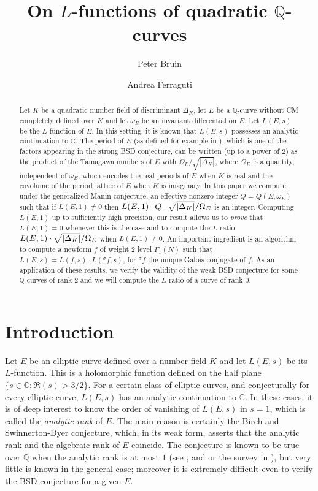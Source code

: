 \documentclass[11pt]{amsart}
\author[P.\thinspace J. Bruin]{Peter Bruin}
\author[A. Ferraguti]{Andrea Ferraguti}
\date{}
\title{On $L$-functions of quadratic ${\mathbb{Q}}$-curves}
\theoremstyle{definition}
\begin{document}
\begin{abstract}
Let $K$ be a quadratic number field of discriminant $\Delta_K$, let $E$ be a ${\mathbb{Q}}$-curve without CM completely defined over $K$ and let $\omega_E$ be an invariant differential on $E$. Let $L(E,s)$ be the $L$-function of $E$. In this setting, it is known that $L(E,s)$ possesses an analytic continuation to ${\mathbb{C}}$. The period of $E$ (as defined for example in \cite{gro2}), which is one of the factors appearing in the strong BSD conjecture, can be written (up to a power of $2$) as the product of the Tamagawa numbers of $E$ with $\Omega_E/\sqrt{|\Delta_K|}$, where $\Omega_E$ is a quantity, independent of $\omega_E$, which encodes the real periods of $E$ when $K$ is real and the covolume of the period lattice of $E$ when $K$ is imaginary. In this paper we compute, under the generalized Manin conjecture, an effective nonzero integer $Q=Q(E,\omega_E)$ such that if $L(E,1)\neq 0$ then ${\displaystyle} L(E,1)\cdot Q\cdot\sqrt{|\Delta_K|}/\Omega_E$ is an integer. Computing $L(E,1)$ up to sufficiently high precision, our result allows us to \emph{prove} that $L(E,1)=0$ whenever this is the case and to compute the $L$-ratio ${\displaystyle} L(E,1)\cdot\sqrt{|\Delta_K|}/\Omega_E$ when $L(E,1)\neq 0$. An important ingredient is an algorithm to compute a newform $f$ of weight $2$ level $\Gamma_1(N)$ such that $L(E,s)=L(f,s)\cdot L({{}^\sigma\!} f,s)$, for ${{}^\sigma\!} f$ the unique Galois conjugate of $f$. As an application of these results, we verify the validity of the weak BSD conjecture for some ${\mathbb{Q}}$-curves of rank $2$ and we will compute the $L$-ratio of a curve of rank $0$.
\end{abstract}

\maketitle

	\section{Introduction}
	Let $E$ be an elliptic curve defined over a number field $K$ and let $L(E,s)$ be its $L$-function. This is a holomorphic function defined on the half plane $\{s\in {\mathbb{C}}\colon \Re(s)>3/2\}$. For a certain class of elliptic curves, and conjecturally for every elliptic curve, $L(E,s)$ has an analytic continuation to ${\mathbb{C}}$. In these cases, it is of deep interest to know the order of vanishing of $L(E,s)$ in $s=1$, which is called the \emph{analytic rank} of $E$. The main reason is certainly the Birch and Swinnerton-Dyer conjecture, which, in its weak form, asserts that the analytic rank and the algebraic rank of $E$ coincide. The conjecture is known to be true over ${\mathbb{Q}}$ when the analytic rank is at most $1$ (see \cite{groza}, \cite{kol} and \cite{mur} or the survey in \cite{gro}), but very little is known in the general case; moreover it is extremely difficult even to verify the BSD conjecture for a given $E$.
\end{document}
